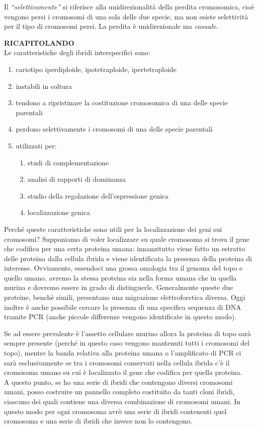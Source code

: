\documentclass[11pt]{book}
\begin{document}
Il \emph{``selettivamente''} si riferisce alla unidirezionalità della perdita cromosomica, cioè vengono persi i cromosomi di una sola delle due specie, ma non esiste selettività per il tipo di cromosomi persi. La perdita è unidirezionale ma \emph{casuale}.


\textbf{RICAPITOLANDO}\\
Le caratteristiche degli ibridi interspecifici sono:
\begin{enumerate}
\item cariotipo iperdiploide, ipotetraploide, ipertetraploide
\item instabili in coltura
\item tendono a ripristinare la costituzione cromosomica di una delle specie parentali
\item perdono selettivamente i cromosomi di una delle specie parentali
\item utilizzati per:
	\begin{enumerate}
		\item studi di complementazione
        \item analisi di rapporti di dominanza
        \item studio della regolazione dell’espressione genica
        \item localizzazione genica
	\end{enumerate}
\end{enumerate}


Perché queste caratteristiche sono utili per la localizzazione dei geni sui cromosomi?
Supponiamo di voler localizzare su quale cromosoma si trova il gene che codifica per una certa proteina umana: innanzitutto viene fatto un estratto delle proteina dalla cellula ibrida e viene identificata la presenza della proteina di interesse. Ovviamente, essendoci una grossa omologia tra il genoma del topo e quello umano, avremo la stessa proteina sia nella forma umana che in quella murina e dovremo essere in grado di distinguerle. Generalmente queste due proteine, benchè simili, presentano una migrazione elettroforetica diversa. Oggi inoltre è anche possibile cercare la presenza di una specifica sequenza di DNA tramite PCR (anche piccole differenze vengono identificate in questo modo).

Se ad essere prevalente è l’assetto cellulare murino allora la proteina di topo sarà sempre presente (perché in questo caso vengono mantenuti tutti i cromosomi del topo), mentre la banda relativa alla proteina umana o l’amplificato di PCR ci sarà esclusivamente se tra i cromosomi conservati nella cellula ibrida c’è il cromosoma umano su cui è localizzato il gene che codifica per quella proteina.\\
A questo punto, se ho una serie di ibridi che contengono diversi cromosomi umani, posso costruire un pannello completo costituito da tanti cloni ibridi, ciascuno dei quali contiene una diversa combinazione di cromosomi umani. In questo modo per ogni cromosoma avrò una serie di ibridi contenenti quel cromosoma e una serie di ibridi che invece non lo contengono.
\end{document}
